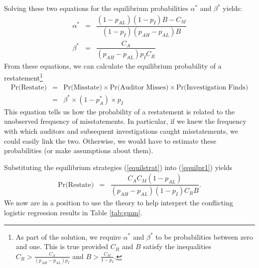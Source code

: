 Solving these two equations for the equilibrium probabilities $\alpha^*$ and $\beta^*$
yields:
\begin{equation}\label{equilstrat}
\begin{array}{lcl}
  \alpha^* &= & \dfrac{ ( 1 - p_{AL}) (1 - p_I) B- C_M}{ (1 - p_I) (p_{AH}-p_{AL}) B}\\[1.5em]
  \beta^* &= & \dfrac{C_A}{(p_{AH}-p_{AL}) p_I C_R}  
\end{array}
\end{equation}
From these equations, we can calculate the equilibrium probability of a restatement\footnote{
As part of the solution, we require $\alpha^*$ and $\beta^*$ to be probabilities between
zero and one. 
This is true provided $C_R$ and $B$ satisfy the inequalities
$ C_R > \frac{C_A}{(p_{AH}-p_{AL})p_I} $
and 
$ B > \frac{C_M}{1 - p_I}  $.}
\begin{equation} \label{equilpr1}
\begin{array}{lcl}
\mbox{Pr(Restate)} & = &  \mbox{Pr(Misstate)} \times \mbox{Pr(Auditor Misses)} \times
\mbox{Pr(Investigation Finds)}\\[1em]
& = & \beta^* \times (1-p_A^*) \times p_I
\end{array}\end{equation}
This equation tells us how the probability of a restatement is related to the unobserved frequency of misstatements.
In particular, if we knew the frequency with which auditors and subsequent investigations caught misstatements, we could easily link the two. 
Otherwise, we would have to estimate these probabilities (or make assumptions about them).

Substituting the equilibrium strategies (\ref{equilstrat}) into (\ref{equilpr1}) yields
\begin{equation} \label{equilpr2}
\begin{array}{lcl}
\mbox{Pr(Restate)}& = &  \dfrac{C_AC_M(1-p_{AL})}{(p_{AH}-p_{AL})(1-p_I)C_RB}.
\end{array}\end{equation}
We now are in a position to use the theory to help interpret the conflicting logistic regression results
in Table \ref{tab:gmm}. 

